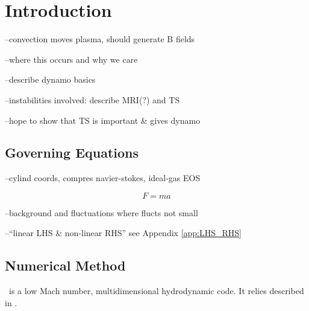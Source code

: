 %
%

\section{Introduction}
\label{sec:intro}

--convection moves plasma, should generate B fields

--where this occurs and why we care

--describe dynamo basics

--instabilities involved: describe MRI(?) and TS

--hope to show that TS is important \& gives dynamo

\subsection{Governing Equations}
\label{sec:eqn}

--cylind coords, compres navier-stokes, ideal-gas EOS

\begin{equation}
F=ma
\end{equation}

--background and fluctuations where flucts not small

--``linear LHS \& non-linear RHS'' see Appendix \ref{app:LHS_RHS}

\subsection{Numerical Method}
\label{sec:dedalus}

\dedalus\ is a low Mach number, multidimensional hydrodynamic code. It relies 
described in \cite{flames}.

